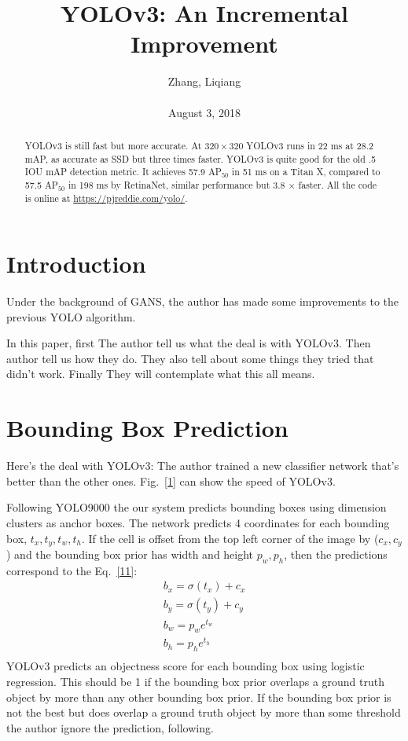 \documentclass[10pt,twocolumn,letterpaper]{article}
\title{\textbf{YOLOv3: An Incremental Improvement}}
\author{Zhang, Liqiang\\\\August 3, 2018}
\begin{document}
\maketitle
\par
\begin{abstract}
YOLOv3 is still fast but more accurate. At $320\times 320$ YOLOv3 runs in 22 ms at 28.2 mAP, as accurate as SSD but three times faster. YOLOv3 is quite good for the old .5 IOU mAP detection metric. It achieves 57.9 AP$_{50}$ in 51 ms on a Titan X, compared to 57.5 AP$_{50}$ in 198 ms by RetinaNet, similar performance but 3.8 $\times$ faster. All the code is online at \url{https://pjreddie.com/yolo/}.
\end{abstract}
\section{Introduction}
Under the background of GANS, the author has made some improvements to the previous YOLO algorithm. 
\par
In this paper, first The author tell us what the deal is with YOLOv3. Then author tell us how they do. They also tell about some things they tried that didn’t work. Finally They will contemplate what this all means.
\section{Bounding Box Prediction}
Here’s the deal with YOLOv3: The author trained a new classifier network that’s better than the other ones. Fig.~\ref{1} can show the speed of YOLOv3. 
\par
Following YOLO9000 the our system predicts bounding boxes using dimension clusters as anchor boxes. The network predicts 4 coordinates for each bounding box, $t_x, t_y, t_w, t_h$\cite{He2015Deep}. If the cell is offset from the top left corner of the image by ($c_x, c_y$) and the bounding box prior has width and height $p_w, p_h$, then the predictions correspond to the Eq.~\ref{11}:
\begin{equation}\label{11}
\begin{split}
b_x=\sigma(t_x)+c_x \\
b_y=\sigma(t_y)+c_y \\
b_w=p_we^{t_w} \\
b_h=p_he^{t_h} \\
\end{split}
\end{equation}
YOLOv3 predicts an objectness score for each bounding box using logistic regression. This should be 1 if the bounding box prior overlaps a ground truth object by more than any other bounding box prior. If the bounding box prior is not the best but does overlap a ground truth object by more than some threshold the author ignore the prediction, following.
\end{document}
